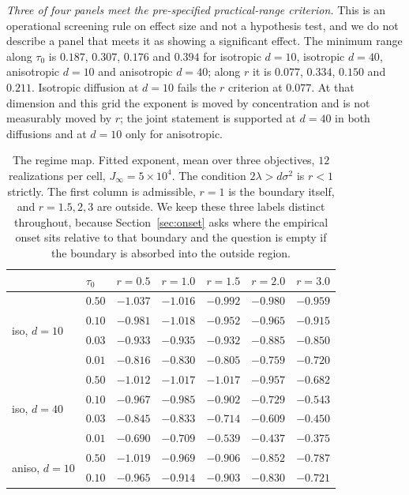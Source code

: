 \documentclass[pdflatex,sn-mathphys-num]{sn-jnl}
\theoremstyle{thmstyleone}
\theoremstyle{thmstyletwo}
\theoremstyle{thmstylethree}
\begin{document}
\emph{Three of four panels meet the pre-specified practical-range criterion.} This is an operational screening rule on effect size and not a hypothesis test, and we do not describe a panel that meets it as showing a significant effect. The minimum range along $\tau_0$ is $0.187$, $0.307$, $0.176$ and $0.394$ for isotropic $d=10$, isotropic $d=40$, anisotropic $d=10$ and anisotropic $d=40$; along $r$ it is $0.077$, $0.334$, $0.150$ and $0.211$. Isotropic diffusion at $d=10$ fails the $r$ criterion at $0.077$. At that dimension and this grid the exponent is moved by concentration and is not measurably moved by $r$; the joint statement is supported at $d=40$ in both diffusions and at $d=10$ only for anisotropic.

\begin{table}[h]
\caption{The regime map. Fitted exponent, mean over three objectives, $12$ realizations per cell, $J_\infty=5\times10^4$. The condition $2\lambda>d\sigma^2$ is $r<1$ strictly. The first column is admissible, $r=1$ is the boundary itself, and $r=1.5,2,3$ are outside. We keep these three labels distinct throughout, because Section~\ref{sec:onset} asks where the empirical onset sits relative to that boundary and the question is empty if the boundary is absorbed into the outside region.}\label{tab:map}
\begin{tabular}{@{}llccccc@{}}
\toprule
& $\tau_0$ & $r=0.5$ & $r=1.0$ & $r=1.5$ & $r=2.0$ & $r=3.0$\\
\midrule
\multirow{4}{*}{iso, $d=10$}
 & $0.50$ & $-1.037$ & $-1.016$ & $-0.992$ & $-0.980$ & $-0.959$\\
 & $0.10$ & $-0.981$ & $-1.018$ & $-0.952$ & $-0.965$ & $-0.915$\\
 & $0.03$ & $-0.933$ & $-0.935$ & $-0.932$ & $-0.885$ & $-0.850$\\
 & $0.01$ & $-0.816$ & $-0.830$ & $-0.805$ & $-0.759$ & $-0.720$\\
\midrule
\multirow{4}{*}{iso, $d=40$}
 & $0.50$ & $-1.012$ & $-1.017$ & $-1.017$ & $-0.957$ & $-0.682$\\
 & $0.10$ & $-0.967$ & $-0.985$ & $-0.902$ & $-0.729$ & $-0.543$\\
 & $0.03$ & $-0.845$ & $-0.833$ & $-0.714$ & $-0.609$ & $-0.450$\\
 & $0.01$ & $-0.690$ & $-0.709$ & $-0.539$ & $-0.437$ & $-0.375$\\
\midrule
\multirow{4}{*}{aniso, $d=10$}
 & $0.50$ & $-1.019$ & $-0.969$ & $-0.906$ & $-0.852$ & $-0.787$\\
 & $0.10$ & $-0.965$ & $-0.914$ & $-0.903$ & $-0.830$ & $-0.721$\\

\end{tabular}
\end{table}
\end{document}
